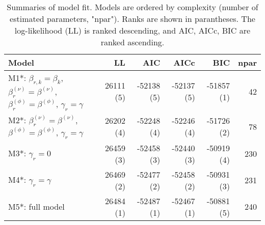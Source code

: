 \begin{table}[ht]
\centering
\begingroup\fontsize{9pt}{10pt}\selectfont
\begin{tabular}{l|rrrrr}
  \hline
Model & LL & AIC & AICc & BIC & npar \\ 
  \hline
M1*: $\beta_{r,k} = \beta_{k}$, $\beta_{r}^{(\nu)} = \beta^{(\nu)}$, $\beta_{r}^{(\phi)} = \beta^{(\phi)}$, $\gamma_r = \gamma$ & 26111 (5) & -52138 (5) & -52137 (5) & -51857 (1) & 42 \\ 
  M2*: $\beta_{r}^{(\nu)} = \beta^{(\nu)}$, $\beta^{(\phi)} = \beta^{(\phi)}$, $\gamma_r = \gamma$ & 26202 (4) & -52248 (4) & -52246 (4) & -51726 (2) & 78 \\ 
  M3*: $\gamma_r = 0$ & 26459 (3) & -52458 (3) & -52440 (3) & -50919 (4) & 230 \\ 
  M4*: $\gamma_r = \gamma$ & 26469 (2) & -52477 (2) & -52458 (2) & -50931 (3) & 231 \\ 
  M5*: full model & 26484 (1) & -52487 (1) & -52467 (1) & -50881 (5) & 240 \\ 
   \hline
\end{tabular}
\endgroup
\caption{Summaries of model fit.
             Models are ordered by complexity (number of estimated parameters, "npar").
             Ranks are shown in parantheses.
             The log-likelihood (LL) is ranked descending,
             and AIC, AICc, BIC are ranked ascending.} 
\label{tab:mBetafit}
\end{table}
